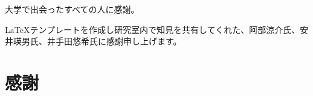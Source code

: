 \begin{acknowledgment}

大学で出会ったすべての人に感謝。

LaTeXテンプレートを作成し研究室内で知見を共有してくれた、阿部涼介氏、安井瑛男氏、井手田悠希氏に感謝申し上げます。

\section*{感謝}








\end{acknowledgment}
